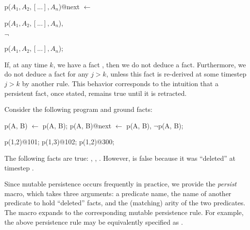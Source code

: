 \begin{dedalus}
p\pos($A_1,A_2,[...],A_n$)@next $\leftarrow$
\end{dedalus}

\hspace{5mm}
\begin{dedalus}
p\pos($A_1,A_2,[...],A_n$),
\end{dedalus}

\hspace{5mm}
$\lnot$
\begin{dedalus}
p\nega($A_1,A_2,[...],A_n$);
\end{dedalus}

%
%
\noindent
If, at any time $k$, we have a fact
, then we do not deduce a
 fact.  Furthermore, we do not
deduce a  fact for any $j > k$, unless
this  fact is re-derived at some timestep $j > k$ by another
rule.  This behavior corresponds to the intuition that a persistent fact, once stated,
remains true until it is retracted.  

\begin{example}
Consider the following \slang program and ground facts:

\begin{Dedalus}
p\pos(A, B) \(\leftarrow\) p(A, B);
p\pos(A, B)@next \(\leftarrow\) p\pos(A, B), \(\lnot\)p\nega(A, B);

p(1,2)@101;
p(1,3)@102;
p\nega(1,2)@300;
\end{Dedalus}

\noindent{}The following facts are true: , ,
.  However,  is false because it was
``deleted'' at timestep .
\end{example}

Since mutable persistence occurs frequently in practice, we provide the {\em
persist} macro, which takes three arguments: a predicate name, the name of another predicate to hold ``deleted'' facts, and the (matching) arity of the two predicates. The macro
expands to the corresponding mutable persistence rule.  For example, the above
 persistence rule may be equivalently specified as
.

